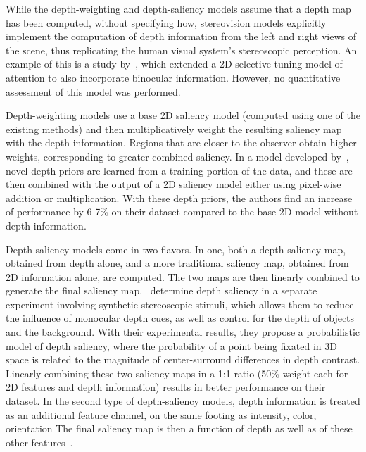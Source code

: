 While the depth-weighting and depth-saliency models assume that a depth map has been computed, without specifying how, stereovision models explicitly implement the computation of depth information from the left and right views of the scene, thus replicating the human visual system's stereoscopic perception. An example of this is a study by~\cite{Bruce_Tsotsos05}, which extended a 2D selective tuning model of attention to also incorporate binocular information. However, no quantitative assessment of this model was performed.

Depth-weighting models use a base 2D saliency model (computed using one of the existing methods) and then multiplicatively weight the resulting saliency map with the depth information. Regions that are closer to the observer obtain higher weights, corresponding to greater combined saliency. In a model developed by~\cite{Lang_etal12}, novel depth priors are learned from a training portion of the data, and these are then combined with the output of a 2D saliency model either using pixel-wise addition or multiplication. With these depth priors, the authors find an increase of performance by 6-7\% on their dataset compared to the base 2D model without depth information.

Depth-saliency models come in two flavors. In one, both a depth saliency map, obtained from depth alone, and a more traditional saliency map, obtained from 2D information alone, are computed. The two maps are then linearly combined to generate the final saliency map.~\cite{Wang_etal13} determine depth saliency in a separate experiment involving synthetic stereoscopic stimuli, which allows them to reduce the influence of monocular depth cues, as well as control for the depth of objects and the background. With their experimental results, they propose a probabilistic model of depth saliency, where the probability of a point being fixated in 3D space is related to the magnitude of center-surround differences in depth contrast. Linearly combining these two saliency maps in a 1:1 ratio (50\% weight each for 2D features and depth information) results in better performance on their dataset. In the second type of depth-saliency models, depth information is treated as an additional feature channel, on the same footing as intensity, color, orientation \etc The final saliency map is then a function of depth as well as of these other features~\citep{Ouerhani_etal00,Jost_etal04,Hugli_etal05}.

